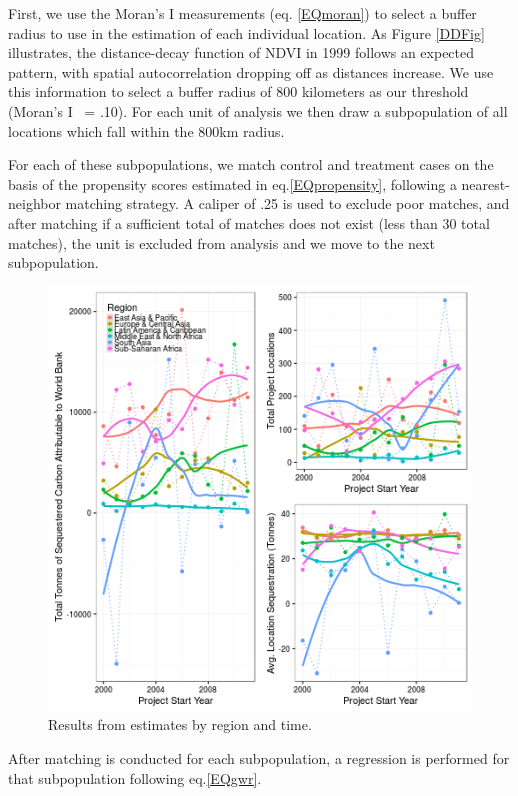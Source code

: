 \documentclass{article}\usepackage[]{graphicx}\usepackage[]{color}
\newenvironment{knitrout}{}{}  %
\begin{document}
\begin{knitrout}
First, we use the Moran's I measurements (eq. \ref{EQmoran}) to select a buffer radius to use in the estimation of each individual location.
As Figure \ref{DDFig} illustrates, the distance-decay function of NDVI in 1999 follows an expected pattern, with spatial autocorrelation dropping off as distances increase.  
We use this information to select a buffer radius of 800 kilometers as our threshold (Moran's I ~= .10).  
For each unit of analysis we then draw a subpopulation of all locations which fall within the 800km radius.
\par
For each of these subpopulations, we match control and treatment cases on the basis of the propensity scores estimated in eq.\ref{EQpropensity}, following a nearest-neighbor matching strategy.  
A caliper of .25 is used to exclude poor matches, and after matching if a sufficient total of matches does not exist (less than 30 total matches), the unit is excluded from analysis and we move to the next subpopulation. 
\par
\begin{figure}
\centering
 \includegraphics{result_disag.png}
\caption{Results from estimates by region and time.}
\label{result_fig}
\vspace{10pt}
\end{figure}  
After matching is conducted for each subpopulation, a regression is performed for that subpopulation following eq.\ref{EQgwr}.  

\end{knitrout}
\end{document}

